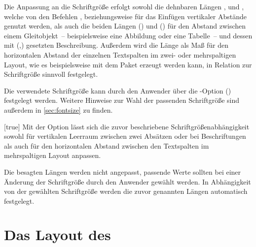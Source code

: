 \begin{Declaration*}{}
\begin{Declaration*}{}
\begin{Declaration*}{}
Die Anpassung an die Schriftgröße erfolgt sowohl die dehnbaren Längen 
,  und , 
welche von den Befehlen ,  beziehungsweise 
 für das Einfügen vertikaler Abstände genutzt werden, als auch 
die beiden Längen () und 
() für den Abstand zwischen 
einem Gleitobjekt~-- beispielsweise eine Abbildung oder eine Tabelle~-- und 
dessen mit (,) 
gesetzten Beschreibung. Außerdem wird die Länge  als Maß für 
den horizontalen Abstand der einzelnen Textspalten im zwei- oder mehrspaltigen 
Layout, wie es beispielsweise mit dem Paket  erzeugt werden 
kann, in Relation zur Schriftgröße sinnvoll festgelegt.

Die verwendete Schriftgröße kann durch den Anwender über die \KOMAScript-Option 
() festgelegt werden.
Weitere Hinweise zur Wahl der passenden Schriftgröße sind außerdem in 
\autoref{sec:fontsize} zu finden.

\begin{Declaration}{}[true]%
\printdeclarationlist%
%
Mit der Option  lässt sich die zuvor beschriebene 
Schriftgrößenabhängigkeit sowohl für vertikalen Leerraum zwischen zwei Absätzen 
oder bei Beschriftungen als auch für den horizontalen Abstand zwischen den 
Textspalten im mehrspaltigen Layout anpassen.
%
\begin{values}{}
  Die besagten Längen werden nicht angepasst, passende Werte sollten bei einer 
  Änderung der Schriftgröße durch den Anwender gewählt werden.
  In Abhängigkeit von der gewählten Schriftgröße werden die zuvor genannten 
  Längen automatisch festgelegt.
\end{values}
\end{Declaration}



\section{Das Layout des \CDs}
%

\end{Declaration*}
\end{Declaration*}
\end{Declaration*}
